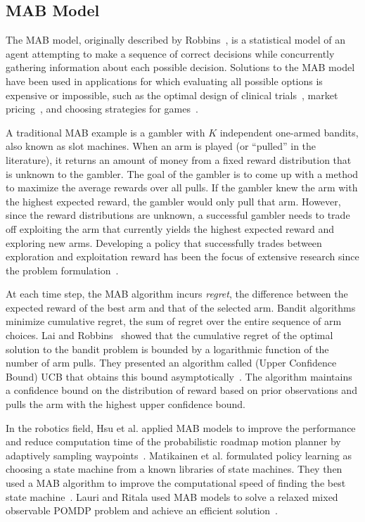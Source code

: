 \documentclass[10pt, conference]{ieeeconf}      %
\begin{document}
\subsection{MAB Model}
The MAB model, originally described by Robbins~\cite{robbins1985some}, is a statistical model of an agent attempting to make a sequence of correct decisions while concurrently gathering information about each possible decision. Solutions to the MAB model have been used in applications for which evaluating all possible options is expensive or impossible, such as the optimal design of clinical trials~\cite{simon1989optimal}, market pricing~\cite{rothschild1974two}, and choosing strategies for games~\cite{st2012online}. 

A traditional MAB example is a gambler with $K$ independent one-armed bandits, also known as slot machines.
When an arm is played (or ``pulled'' in the literature), it returns an amount of money from a fixed reward distribution that is unknown to the gambler.
The goal of the gambler is to come up with a method to maximize the average rewards over all pulls.
If the gambler knew the arm with the highest expected reward, the gambler would only pull that arm.
However, since the reward distributions are unknown, a successful gambler needs to trade off exploiting the arm that currently yields the highest expected reward and exploring new arms.
Developing a policy that successfully trades between exploration and exploitation reward has been the focus of extensive research since the problem formulation~\cite{barto1998reinforcement, robbins1985some}.

At each time step, the MAB algorithm incurs \textit{regret}, the difference between the expected reward of the best arm and that of the selected arm. Bandit algorithms minimize cumulative regret, the sum of regret over the entire sequence of arm choices.
Lai and Robbins~\cite{lai1985asymptotically} showed that the cumulative regret of the optimal solution to the bandit problem is bounded by a logarithmic function of the number of arm pulls.
They presented an algorithm called (Upper Confidence Bound) UCB that obtains this bound asymptotically~\cite{lai1985asymptotically}.
The algorithm maintains a confidence bound on the distribution of reward based on prior observations and pulls the arm with the highest upper confidence bound.


In the robotics field, Hsu et al. applied MAB models to improve the performance and reduce computation time of the probabilistic roadmap motion planner by adaptively sampling waypoints~\cite{hsu2005hybrid}. Matikainen et al. formulated policy learning as choosing a state machine from a known libraries of state machines. They then used a MAB algorithm to improve the computational speed of finding the best state machine~\cite{matikainen2013multi}. Lauri and Ritala used MAB models to solve a relaxed mixed observable POMDP problem and achieve an efficient solution~\cite{Mikko2015POMDP}.
\end{document}
